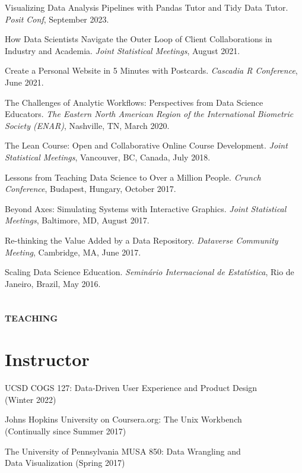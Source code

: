 \begin{innerlist}
\item Visualizing Data Analysis Pipelines with Pandas Tutor and Tidy Data Tutor. \textit{Posit Conf}, September 2023.
\item How Data Scientists Navigate the Outer Loop of Client Collaborations in Industry and Academia. \textit{Joint Statistical Meetings}, August 2021.
\item Create a Personal Website in 5 Minutes with Postcards. \textit{Cascadia R Conference}, June 2021.
\item The Challenges of Analytic Workflows: Perspectives from Data Science Educators. \textit{The Eastern North American Region of the International Biometric Society (ENAR)}, Nashville, TN, March 2020.
\item The Lean Course: Open and Collaborative Online Course Development. \textit{Joint Statistical Meetings}, Vancouver, BC, Canada, July 2018.
\item Lessons from Teaching Data Science to Over a Million People. \textit{Crunch Conference}, Budapest, Hungary, October 2017.
\item Beyond Axes: Simulating Systems with Interactive Graphics. \textit{Joint Statistical Meetings}, Baltimore, MD, August 2017.
\item Re-thinking the Value Added by a Data Repository. \textit{Dataverse Community Meeting}, Cambridge, MA, June 2017.
\item Scaling Data Science Education. \textit{Seminário Internacional de Estatística}, Rio de Janeiro, Brazil, May 2016.
\end{innerlist}


\section{} \textbf{TEACHING} \vspace{-0.05in}

\section{Instructor}

\begin{innerlist}
\item UCSD COGS 127: Data-Driven User Experience and Product Design  \\ (Winter 2022)
\item Johns Hopkins University on Coursera.org: The Unix Workbench \\ (Continually since Summer 2017)
\item The University of Pennsylvania MUSA 850: Data Wrangling and \\ Data Visualization (Spring 2017)
\end{innerlist}

